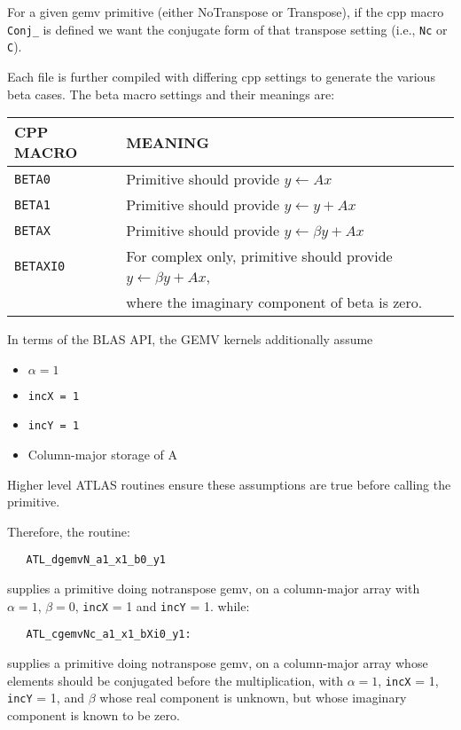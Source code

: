 \documentclass[11pt]{article}
\begin{document}
For a given gemv primitive (either NoTranspose or Transpose), if the cpp macro
\verb+Conj_+
is defined we want the conjugate form of that transpose setting
(i.e., {\tt Nc} or {\tt C}).

Each file is further compiled with differing cpp settings to generate the
various beta cases.  The beta macro settings and their meanings are:

\begin{tabular}{||l|l||}\hline\hline
CPP MACRO & MEANING \\\hline\hline
{\tt BETA0}   & Primitive should provide $y \leftarrow A  x$ \\\hline
{\tt BETA1}   & Primitive should provide $y \leftarrow y + A x$ \\\hline
{\tt BETAX}   & Primitive should provide $y \leftarrow \beta y + A  x$ \\\hline
{\tt BETAXI0} & For complex only, primitive should provide $y \leftarrow \beta y + A x$, \\
        & where the imaginary component of beta is zero. \\\hline\hline
\end{tabular}

In terms of the BLAS API, the GEMV kernels additionally assume
\begin{itemize}
 \item $\alpha = 1$
 \item \verb+incX = 1+
 \item \verb+incY = 1+
 \item Column-major storage of A
\end{itemize}

Higher level ATLAS routines ensure these assumptions are true before calling
the primitive.

Therefore, the routine:
\begin{verbatim}
   ATL_dgemvN_a1_x1_b0_y1
\end{verbatim}
supplies a primitive doing notranspose gemv, on a column-major array with
$\alpha=1$, $\beta=0$, {\tt incX} = 1 and {\tt incY} = 1.  while:
\begin{verbatim}
   ATL_cgemvNc_a1_x1_bXi0_y1:
\end{verbatim}
supplies a primitive doing notranspose gemv, on a column-major array whose
elements should be conjugated before the multiplication, with
$\alpha=1$, {\tt incX} = 1, {\tt incY} = 1, and $\beta$ whose real component
is unknown, but whose imaginary component is known to be zero.
\end{document}

